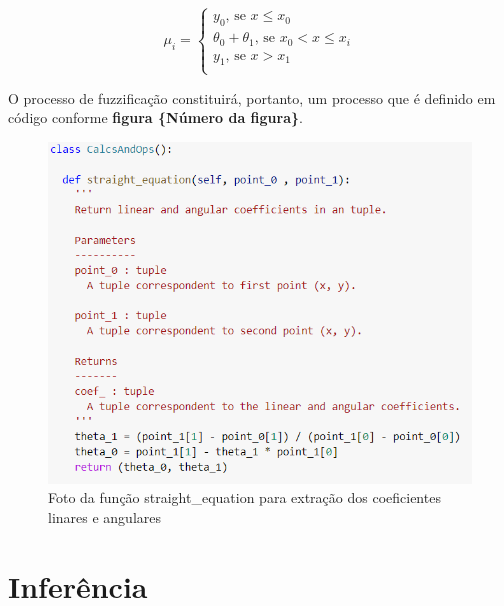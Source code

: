 \documentclass[courier]{uninove-ppgi}
\begin{document}
			 \begin{equation}
			     \mu_{i} = \begin{cases}
			        y_{0} \text{, se } x \leq x_{0} \\
			        \theta_{0} + \theta_1 \text{, se } x_{0} < x \leq x_{i} \\
			        y_{1} \text{, se } x > x_{1} \\
		        \end{cases}
			 \end{equation}
			 
			 O processo de fuzzificação constituirá, portanto, um processo que é definido em código conforme \textbf{figura \{Número da figura\}}. 
			 
			 
		     \begin{figure}[ht!]
    
        	    \begin{center}
        	
        		    \includegraphics[scale=1]{straight equation}
        	
        	    \end{center}
        	
        	    \caption{Foto da função straight\_equation para extração dos coeficientes linares e angulares}
        	
        	
            \end{figure}

		\section{Inferência}
		
\end{document}

